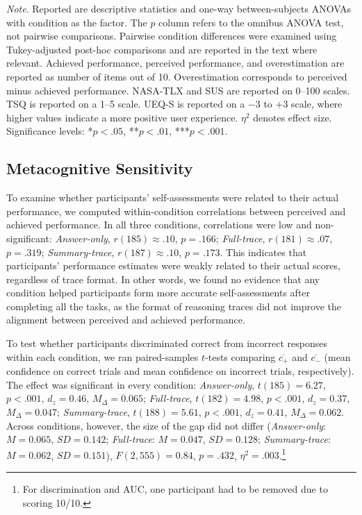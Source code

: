 \documentclass[manuscript, anonymous=false,authorversion,review=false]{acmart}
\begin{document}
\begin{table}[!htp]
\raggedright \small \textit{Note}. Reported are descriptive statistics and one-way between-subjects ANOVAs with condition as the factor. The $p$ column refers to the omnibus ANOVA test, not pairwise comparisons. Pairwise condition differences were examined using Tukey-adjusted post-hoc comparisons and are reported in the text where relevant. Achieved performance, perceived performance, and overestimation are reported as number of items out of 10. Overestimation corresponds to perceived minus achieved performance. NASA-TLX and SUS are reported on 0--100 scales. TSQ is reported on a 1--5 scale. UEQ-S is reported on a $-3$ to $+3$ scale, where higher values indicate a more positive user experience. $\eta^2$ denotes effect size. Significance levels: *$p < .05$, **$p < .01$, ***$p < .001$.
\end{table}


\subsection{Metacognitive Sensitivity}

To examine whether participants' self-assessments were related to their actual performance, we computed within-condition correlations between perceived and achieved performance. In all three conditions, correlations were low and non-significant: \textit{Answer-only}, $r(185) \approx .10$, $p = .166$; \textit{Full-trace}, $r(181) \approx .07$, $p = .319$; \textit{Summary-trace}, $r(187) \approx .10$, $p = .173$. This indicates that participants' performance estimates were weakly related to their actual scores, regardless of trace format. In other words, we found no evidence that any condition helped participants form more accurate self-assessments after completing all the tasks, as the format of reasoning traces did not improve the alignment between perceived and achieved performance. 

To test whether participants discriminated correct from incorrect responses within each condition, we ran paired-samples $t$-tests comparing $\overline{c_{+}}$ and
$\overline{c_{-}}$ (mean confidence on correct trials and mean confidence on incorrect trials, respectively). The effect was significant in every condition: \textit{Answer-only}, $t(185) = 6.27$, $p < .001$, $d_z = 0.46$, $M_{\Delta} = 0.065$; \textit{Full-trace}, $t(182) = 4.98$, $p < .001$, $d_z = 0.37$, $M_{\Delta} = 0.047$; \textit{Summary-trace}, $t(188) = 5.61$,
$p < .001$, $d_z = 0.41$, $M_{\Delta} = 0.062$. Across conditions, however, the size of the gap did not differ (\textit{Answer-only}: $M = 0.065$, $SD = 0.142$; \textit{Full-trace}: $M = 0.047$, $SD = 0.128$; \textit{Summary-trace}: $M = 0.062$, $SD = 0.151$), $F(2, 555) = 0.84$, $p = .432$, $\eta^2 = .003$.\footnote{For discrimination and AUC, one participant had to be removed due to scoring 10/10.\label{footnote_remove}} 
\end{document}
